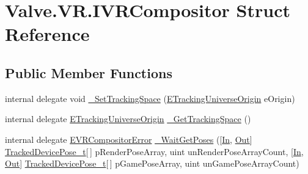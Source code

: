 \hypertarget{struct_valve_1_1_v_r_1_1_i_v_r_compositor}{}\section{Valve.\+V\+R.\+I\+V\+R\+Compositor Struct Reference}
\label{struct_valve_1_1_v_r_1_1_i_v_r_compositor}
\subsection*{Public Member Functions}
\begin{DoxyCompactItemize}
\item 
internal delegate void \mbox{\hyperlink{struct_valve_1_1_v_r_1_1_i_v_r_compositor_a8f3a63140b76c144825aef005d57b9a7}{\+\_\+\+Set\+Tracking\+Space}} (\mbox{\hyperlink{namespace_valve_1_1_v_r_a29be99a3c2f780157bd490db06a7f12f}{E\+Tracking\+Universe\+Origin}} e\+Origin)
\item 
internal delegate \mbox{\hyperlink{namespace_valve_1_1_v_r_a29be99a3c2f780157bd490db06a7f12f}{E\+Tracking\+Universe\+Origin}} \mbox{\hyperlink{struct_valve_1_1_v_r_1_1_i_v_r_compositor_a4a4568c4dfcd60444a4ab3b7bf47a019}{\+\_\+\+Get\+Tracking\+Space}} ()
\item 
internal delegate \mbox{\hyperlink{namespace_valve_1_1_v_r_ac34ee1034fda668ccd45f57676ded81b}{E\+V\+R\+Compositor\+Error}} \mbox{\hyperlink{struct_valve_1_1_v_r_1_1_i_v_r_compositor_a526e58af311d731d5802cb0d3736f7de}{\+\_\+\+Wait\+Get\+Poses}} (\mbox{[}\mbox{\hyperlink{namespace_valve_1_1_v_r_a1e6192cb5ddaf204afab87ccb5728780aefeb369cccbd560588a756610865664c}{In}}, \mbox{\hyperlink{namespace_valve_1_1_v_r_a1e6192cb5ddaf204afab87ccb5728780a7c147cda9e49590f6abe83d118b7353b}{Out}}\mbox{]} \mbox{\hyperlink{struct_valve_1_1_v_r_1_1_tracked_device_pose__t}{Tracked\+Device\+Pose\+\_\+t}}\mbox{[}$\,$\mbox{]} p\+Render\+Pose\+Array, uint un\+Render\+Pose\+Array\+Count, \mbox{[}\mbox{\hyperlink{namespace_valve_1_1_v_r_a1e6192cb5ddaf204afab87ccb5728780aefeb369cccbd560588a756610865664c}{In}}, \mbox{\hyperlink{namespace_valve_1_1_v_r_a1e6192cb5ddaf204afab87ccb5728780a7c147cda9e49590f6abe83d118b7353b}{Out}}\mbox{]} \mbox{\hyperlink{struct_valve_1_1_v_r_1_1_tracked_device_pose__t}{Tracked\+Device\+Pose\+\_\+t}}\mbox{[}$\,$\mbox{]} p\+Game\+Pose\+Array, uint un\+Game\+Pose\+Array\+Count)
\item 

\end{DoxyCompactItemize}
